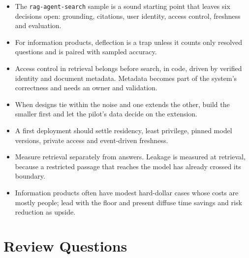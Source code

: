 \begin{itemize}[itemsep=2pt]
  \item The \texttt{rag-agent-search} sample is a sound starting point that leaves six decisions open: grounding, citations, user identity, access control, freshness and evaluation.
  \item For information products, deflection is a trap unless it counts only resolved questions and is paired with sampled accuracy.
  \item Access control in retrieval belongs before search, in code, driven by verified identity and document metadata. Metadata becomes part of the system's correctness and needs an owner and validation.
  \item When designs tie within the noise and one extends the other, build the smaller first and let the pilot's data decide on the extension.
  \item A first deployment should settle residency, least privilege, pinned model versions, private access and event-driven freshness.
  \item Measure retrieval separately from answers. Leakage is measured at retrieval, because a restricted passage that reaches the model has already crossed its boundary.
  \item Information products often have modest hard-dollar cases whose costs are mostly people; lead with the floor and present diffuse time savings and risk reduction as upside.
\end{itemize}

\section*{Review Questions}

